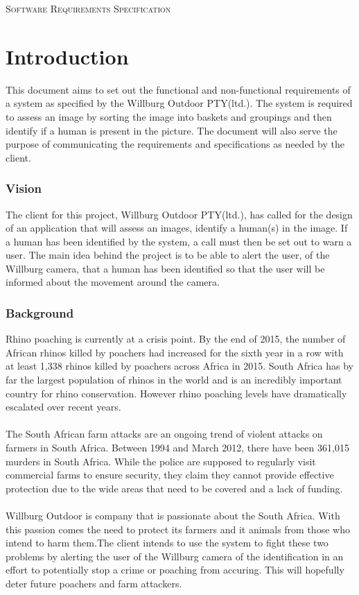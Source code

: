 \documentclass[a4paper,12pt]{report}
\begin{document}
\renewcommand{\thesection}{\arabic{section}}
\newpage
\begin{center}
\textsc{\LARGE Software Requirements Specification}\\[1.5cm]
\end{center}



\section{Introduction}
This document aims to set out the functional and non-functional requirements of a system as specified by the Willburg Outdoor PTY(ltd.). The system is required to assess an image by sorting the image into baskets and groupings and then identify if a human is present in the picture. The document will also serve the purpose of communicating the requirements and specifications as needed by the client.

 \subsubsection{Vision}
 The client for this project, Willburg Outdoor PTY(ltd.), has called for the design of an application that will assess an images, identify a human(s) in the image. If a human has been identified by the system, a call must then be set out to warn a user. The main idea behind the project is to be able to alert the user, of the Willburg camera, that a human has been identified so that the user will be informed about the movement around the camera.

\subsubsection{Background}
Rhino poaching is currently at a crisis point. By the end of 2015, the number of African rhinos killed by poachers had increased for the sixth year in a row with at least 1,338 rhinos killed by poachers across Africa in 2015. South Africa has by far the largest population of rhinos in the world and is an incredibly important country for rhino conservation. However rhino poaching levels have dramatically escalated over recent years. \\
\\The South African farm attacks are an ongoing trend of violent attacks on farmers in South Africa. Between 1994 and March 2012, there have been 361,015 murders in South Africa. While the police are supposed to regularly visit commercial farms to ensure security, they claim they cannot provide effective protection due to the wide areas that need to be covered and a lack of funding.\\
\\Willburg Outdoor is company that is passionate about the South Africa. With this passion comes the need to protect its farmers and it animals from those who intend to harm them.The client intends to use the system to fight these two problems by alerting the user of the Willburg camera of the identification in an effort to potentially stop a crime or poaching from accuring. This will hopefully deter future poachers and farm attackers.
\end{document}
